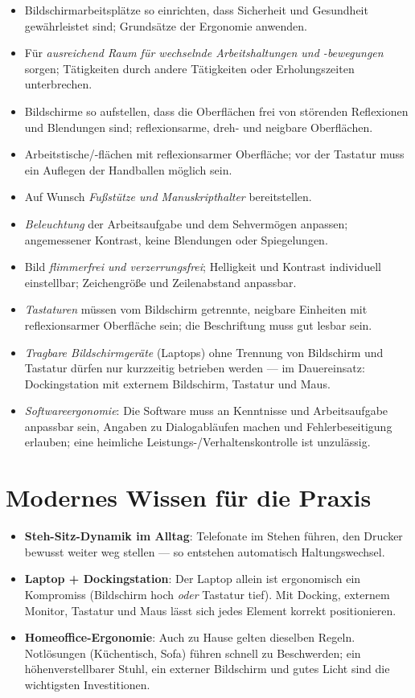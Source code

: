 \documentclass[11pt, a4paper]{article}
\begin{document}
\begin{itemize}
  \item Bildschirmarbeitsplätze so einrichten, dass Sicherheit und Gesundheit gewährleistet
    sind; Grundsätze der Ergonomie anwenden.
  \item Für \emph{ausreichend Raum für wechselnde Arbeitshaltungen und -bewegungen} sorgen;
    Tätigkeiten durch andere Tätigkeiten oder Erholungszeiten unterbrechen.
  \item Bildschirme so aufstellen, dass die Oberflächen frei von störenden Reflexionen und
    Blendungen sind; reflexionsarme, dreh- und neigbare Oberflächen.
  \item Arbeitstische/-flächen mit reflexionsarmer Oberfläche; vor der Tastatur muss ein
    Auflegen der Handballen möglich sein.
  \item Auf Wunsch \emph{Fußstütze und Manuskripthalter} bereitstellen.
  \item \emph{Beleuchtung} der Arbeitsaufgabe und dem Sehvermögen anpassen; angemessener
    Kontrast, keine Blendungen oder Spiegelungen.
  \item Bild \emph{flimmerfrei und verzerrungsfrei}; Helligkeit und Kontrast individuell
    einstellbar; Zeichengröße und Zeilenabstand anpassbar.
  \item \emph{Tastaturen} müssen vom Bildschirm getrennte, neigbare Einheiten mit
    reflexionsarmer Oberfläche sein; die Beschriftung muss gut lesbar sein.
  \item \emph{Tragbare Bildschirmgeräte} (Laptops) ohne Trennung von Bildschirm und Tastatur
    dürfen nur kurzzeitig betrieben werden --- im Dauereinsatz: Dockingstation mit externem
    Bildschirm, Tastatur und Maus.
  \item \emph{Softwareergonomie}: Die Software muss an Kenntnisse und Arbeitsaufgabe
    anpassbar sein, Angaben zu Dialogabläufen machen und Fehlerbeseitigung erlauben; eine
    heimliche Leistungs-/Verhaltenskontrolle ist unzulässig.
\end{itemize}

\section{Modernes Wissen für die Praxis}

\begin{itemize}
  \item \textbf{Steh-Sitz-Dynamik im Alltag}: Telefonate im Stehen führen, den Drucker
    bewusst weiter weg stellen --- so entstehen automatisch Haltungswechsel.
  \item \textbf{Laptop + Dockingstation}: Der Laptop allein ist ergonomisch ein Kompromiss
    (Bildschirm hoch \emph{oder} Tastatur tief). Mit Docking, externem Monitor, Tastatur und
    Maus lässt sich jedes Element korrekt positionieren.
  \item \textbf{Homeoffice-Ergonomie}: Auch zu Hause gelten dieselben Regeln. Notlösungen
    (Küchentisch, Sofa) führen schnell zu Beschwerden; ein höhenverstellbarer Stuhl, ein
    externer Bildschirm und gutes Licht sind die wichtigsten Investitionen.
\end{itemize}
\end{document}
